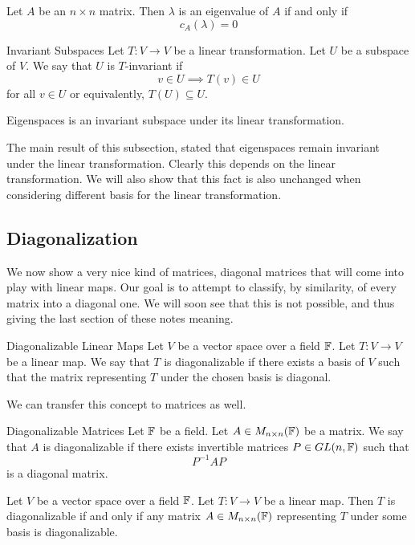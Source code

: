 \documentclass[a4paper]{article}
\begin{document}
\begin{prp}{}{} Let $A$ be an $n\times n$ matrix. Then $\lambda$ is an eigenvalue of $A$ if and only if $$c_A(\lambda)=0$$
\end{prp}

\begin{defn}{Invariant Subspaces}{} Let $T:V\to V$ be a linear transformation. Let $U$ be a subspace of $V$. We say that $U$ is $T$-invariant if $$v\in U\implies T(v)\in U$$ for all $v\in U$ or equivalently, $T(U)\subseteq U$. 
\end{defn}

\begin{thm}{}{} Eigenspaces is an invariant subspace under its linear transformation. 
\end{thm}

The main result of this subsection, stated that eigenspaces remain invariant under the linear transformation. Clearly this depends on the linear transformation. We will also show that this fact is also unchanged when considering different basis for the linear transformation. 

\subsection{Diagonalization}
We now show a very nice kind of matrices, diagonal matrices that will come into play with linear maps. Our goal is to attempt to classify, by similarity, of every matrix into a diagonal one. We will soon see that this is not possible, and thus giving the last section of these notes meaning. 

\begin{defn}{Diagonalizable Linear Maps}{} Let $V$ be a vector space over a field $\mathbb{F}$. Let $T:V\to V$ be a linear map. We say that $T$ is diagonalizable if there exists a basis of $V$ such that the matrix representing $T$ under the chosen basis is diagonal. 
\end{defn}

We can transfer this concept to matrices as well. 

\begin{defn}{Diagonalizable Matrices}{} Let $\mathbb{F}$ be a field. Let $A\in M_{n\times n}(\mathbb{F})$ be a matrix. We say that $A$ is diagonalizable if there exists invertible matrices $P\in GL(n,\mathbb{F})$ such that $$P^{-1}AP$$ is a diagonal matrix. 
\end{defn}

\begin{lmm}{}{} Let $V$ be a vector space over a field $\mathbb{F}$. Let $T:V\to V$ be a linear map. Then $T$ is diagonalizable if and only if any matrix $A\in M_{n\times n}(\mathbb{F})$ representing $T$ under some basis is diagonalizable. 
\end{lmm}
\end{document}
